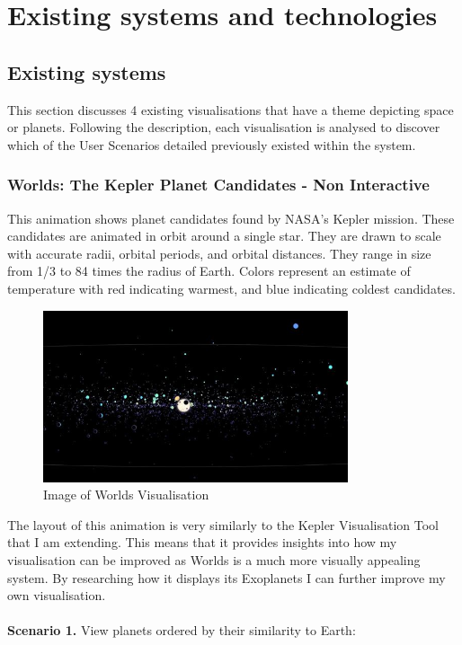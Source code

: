 \chapter{Existing systems and technologies} 
\section{Existing systems}
This section discusses 4 existing visualisations that have a theme depicting
space or planets. Following the description, each visualisation is analysed to
discover which of the User Scenarios detailed previously existed within the
system.
\subsection{Worlds: The Kepler Planet Candidates - Non Interactive}
 This animation \cite{worlds} shows  planet candidates found by NASA's Kepler
mission. These candidates are animated in orbit around a single star. They are
drawn to scale with accurate radii, orbital periods, and orbital distances. They
range in size from 1/3 to 84 times the radius of Earth. Colors represent an
estimate of temperature with red indicating warmest, and blue indicating coldest
candidates. 
\begin{figure}[h!]
  \centering
      \includegraphics[width=0.8\textwidth]{images/worlds.jpg}
  \caption{Image of Worlds Visualisation}
\end{figure}
The layout of this animation is very similarly to the Kepler Visualisation Tool
that I am extending. This means that it provides insights into how my
visualisation can be improved as Worlds is a much more visually appealing
system. By researching how it displays its Exoplanets I can further improve my
own visualisation.
 \\\\
{\bf Scenario 1.} View planets ordered by their similarity to Earth:\\
